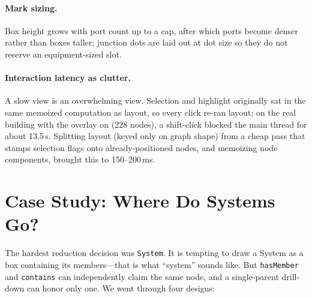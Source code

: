 \documentclass[10pt,twocolumn]{article}
\newcommand{\pred}[1]{\texttt{#1}}   %
\begin{document}
\paragraph{Mark sizing.}
Box height grows with port count up to a cap, after which ports become denser
rather than boxes taller; junction dots are laid out at dot size so they do not
reserve an equipment-sized slot.

\paragraph{Interaction latency as clutter.}
A slow view is an overwhelming view. Selection and highlight originally sat in
the same memoized computation as layout, so every click re-ran layout; on the real
building with the overlay on (228 nodes), a shift-click blocked the main thread
for about 13.5\,s. Splitting layout (keyed only on graph shape) from a cheap
pass that stamps selection flags onto already-positioned nodes, and memoizing node
components, brought this to 150--200\,ms.

\section{Case Study: Where Do Systems Go?}
\label{sec:systems}

The hardest reduction decision was \pred{System}. It is tempting to draw a System
as a box containing its members---that is what ``system'' sounds like. But
\pred{hasMember} and \pred{contains} can independently claim the same node, and a
single-parent drill-down can honor only one. We went through four designs:
\end{document}
